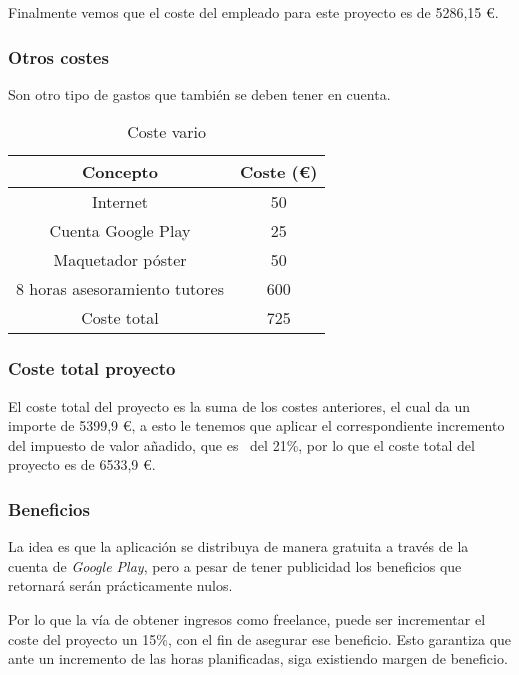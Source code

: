 Finalmente vemos que el coste del empleado para este proyecto es de 5286,15 €.

\subsubsection{Otros costes}
Son otro tipo de gastos que también se deben tener en cuenta.

\begin{table}[H]
	\begin{center}
		\begin{tabular}{cc}
			\hline
			Concepto                        & Coste (€)  	\\ \hline
			Internet					    & 50     		\\
			Cuenta Google Play				& 25			\\ 
			Maquetador póster					    & 50     		\\
			8 horas asesoramiento tutores &	600		\\ \hline
			Coste total            	 		&725			\\ \hline
		\end{tabular}
		\caption{Coste vario}
		\label{table:costevario}
	\end{center}
\end{table}

\subsubsection{Coste total proyecto}
El coste total del proyecto es la suma de los costes anteriores, el cual da un importe de 5399,9 €, a esto le tenemos que aplicar el correspondiente incremento del impuesto de valor añadido, que es~\cite{noauthor_freelancercom_2020} del 21\%, por lo que el coste total del proyecto es de 6533,9 €.

\subsubsection{Beneficios}
La idea es que la aplicación se distribuya de manera gratuita a través de la cuenta de \emph{Google Play}, pero a pesar de tener publicidad los beneficios que retornará serán prácticamente nulos.

Por lo que la vía de obtener ingresos como freelance, puede ser incrementar el coste del proyecto un 15\%, con el fin de asegurar ese beneficio. Esto garantiza que ante un incremento de las horas planificadas, siga existiendo margen de beneficio.

